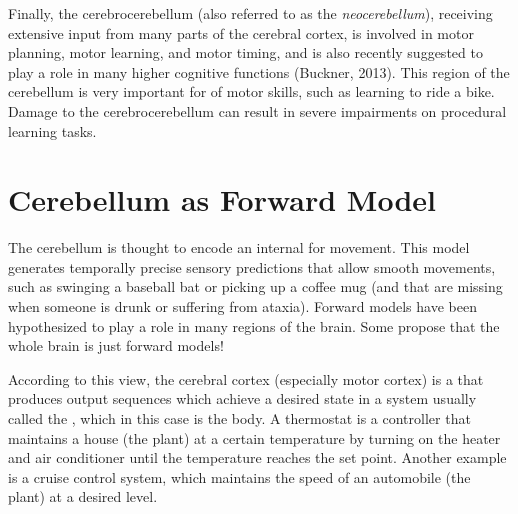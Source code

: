 Finally, the cerebrocerebellum (also referred to as the \emph{neocerebellum}), receiving extensive input from many parts of the cerebral cortex, is involved in motor planning, motor learning, and motor timing, and is also recently suggested to play a role in many higher cognitive functions (Buckner, 2013). This region of the cerebellum is very important for  of motor skills, such as learning to ride a bike. Damage to the cerebrocerebellum can result in severe impairments on procedural learning tasks. 

 
\section{Cerebellum as Forward Model}
 
 
 
The  cerebellum is thought to encode an internal  for movement. This model generates temporally precise sensory predictions that allow smooth movements, such as swinging a baseball bat or picking up a coffee mug (and that are missing when someone is drunk or suffering from ataxia). Forward models have been hypothesized to play a role in many regions of the brain. Some propose that the whole brain is just forward models! 

According to this view, the cerebral cortex (especially motor cortex) is a  that produces output sequences which achieve a desired state in a system usually called the , which in this case is the body. A thermostat is a controller that maintains a house (the plant) at a certain temperature by turning on the heater and air conditioner until the temperature reaches the set point. Another example is a cruise control system, which maintains the speed of an automobile (the plant) at a desired level.

